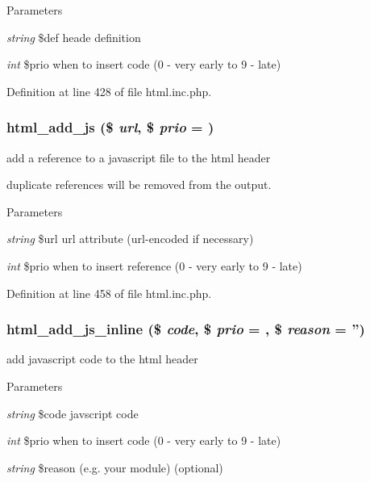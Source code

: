\begin{DoxyParams}{Parameters}
\item[{\em string}]\$def heade definition \item[{\em int}]\$prio when to insert code (0 -\/ very early to 9 -\/ late) \end{DoxyParams}


Definition at line 428 of file html.inc.php.

\hypertarget{html_8inc_8php_a450214704e1bbc2e8849abb54db38a03}{
\subsubsection[{html\_\-add\_\-js}]{\setlength{\rightskip}{0pt plus 5cm}html\_\-add\_\-js (\$ {\em url}, \/  \$ {\em prio} = {})}}
\label{html_8inc_8php_a450214704e1bbc2e8849abb54db38a03}
add a reference to a javascript file to the html header

duplicate references will be removed from the output. 
\begin{DoxyParams}{Parameters}
\item[{\em string}]\$url url attribute (url-\/encoded if necessary) \item[{\em int}]\$prio when to insert reference (0 -\/ very early to 9 -\/ late) \end{DoxyParams}


Definition at line 458 of file html.inc.php.

\hypertarget{html_8inc_8php_a9b9c28bfb08c81ccc10a3064b6775dc0}{
\subsubsection[{html\_\-add\_\-js\_\-inline}]{\setlength{\rightskip}{0pt plus 5cm}html\_\-add\_\-js\_\-inline (\$ {\em code}, \/  \$ {\em prio} = {}, \/  \$ {\em reason} = {\ttfamily ''})}}
\label{html_8inc_8php_a9b9c28bfb08c81ccc10a3064b6775dc0}
add javascript code to the html header


\begin{DoxyParams}{Parameters}
\item[{\em string}]\$code javscript code \item[{\em int}]\$prio when to insert code (0 -\/ very early to 9 -\/ late) \item[{\em string}]\$reason (e.g. your module) (optional) \end{DoxyParams}


